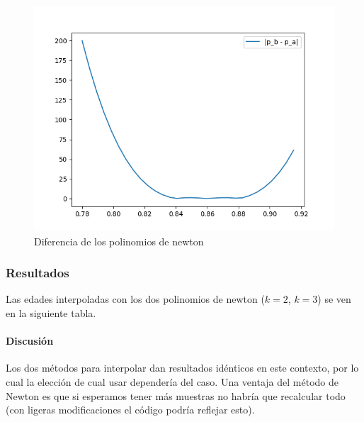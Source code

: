 \begin{figure}[H]
	\includegraphics[width=\linewidth]{figures/figure5.png}
	\caption{Diferencia de los polinomios de newton}
	\label{fig:diff_interp_newt}
\end{figure}


\subsubsection{Resultados} 

Las edades interpoladas con los dos polinomios de newton ($k=2$, $k=3$) se ven en la siguiente tabla.

\begin{table}[htbp]
	\centering
\end{table}

\paragraph{Discusión} 
Los dos métodos para interpolar dan resultados idénticos en este contexto, por lo cual la elección de cual usar dependería del caso. Una ventaja del método de Newton es que si esperamos tener más muestras no habría que recalcular todo (con ligeras modificaciones el código podría reflejar esto).